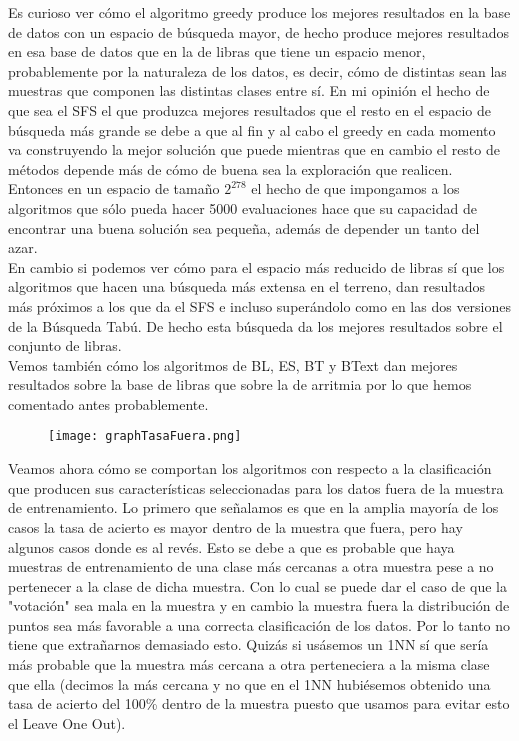 \documentclass[10pt,a4paper]{article}
\begin{document}
Es curioso ver cómo el algoritmo greedy produce los mejores resultados en la base de datos con un espacio de búsqueda mayor, de hecho produce mejores resultados en esa base de datos que en la de libras que tiene un espacio menor, probablemente por la naturaleza de los datos, es decir, cómo de distintas sean las muestras que componen las distintas clases entre sí. En mi opinión el hecho de que sea el SFS el que produzca mejores resultados que el resto en el espacio de búsqueda más grande se debe a que al fin y al cabo el greedy en cada momento va construyendo la mejor solución que puede mientras que en cambio el resto de métodos depende más de cómo de buena sea la exploración que realicen. Entonces en un espacio de tamaño $2^{278}$ el hecho de que impongamos a los algoritmos que sólo pueda hacer 5000 evaluaciones hace que su capacidad de encontrar una buena solución sea pequeña, además de depender un tanto del azar.\\

En cambio si podemos ver cómo para el espacio más reducido de libras sí que los algoritmos que hacen una búsqueda más extensa en el terreno, dan resultados más próximos a los que da el SFS e incluso superándolo como en las dos versiones de la Búsqueda Tabú. De hecho esta búsqueda da los mejores resultados sobre el conjunto de libras.\\

Vemos también cómo los algoritmos de BL, ES, BT y BText dan mejores resultados sobre la base de libras que sobre la de arritmia por lo que hemos comentado antes probablemente.\\

\begin{figure}[H]
\centering
\texttt{[image: graphTasaFuera.png]}
\end{figure}

Veamos ahora cómo se comportan los algoritmos con respecto a la clasificación que producen sus características seleccionadas para los datos fuera de la muestra de entrenamiento. Lo primero que señalamos es que en la amplia mayoría de los casos la tasa de acierto es mayor dentro de la muestra que fuera, pero hay algunos casos donde es al revés. Esto se debe a que es probable que haya muestras de entrenamiento de una clase más cercanas a otra muestra pese a no pertenecer a la clase de dicha muestra. Con lo cual se puede dar el caso de que la "votación" sea mala en la muestra y en cambio la muestra fuera la distribución de puntos sea más favorable a una correcta clasificación de los datos. Por lo tanto no tiene que extrañarnos demasiado esto. Quizás si usásemos un 1NN sí que sería más probable que la muestra más cercana a otra perteneciera a la misma clase que ella (decimos la más cercana y no que en el 1NN hubiésemos obtenido una tasa de acierto del 100\% dentro de la muestra puesto que usamos para evitar esto el Leave One Out).\\
\end{document}
